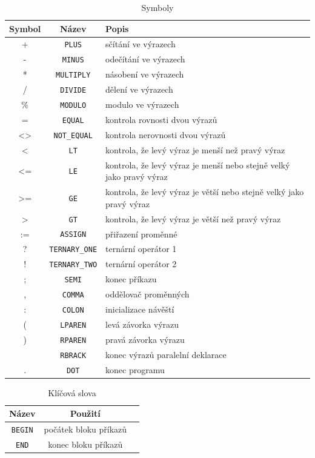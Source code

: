\documentclass[
12pt,
a4paper,
pdftex,
czech,
titlepage
]{report}
\begin{document}
\begin{longtable}{|c|c|p{10cm}|}
\caption{Symboly}
\label{symboly}
\endfirsthead
\endhead
\hline
		\textbf{Symbol} & \textbf{Název} & \textbf{Popis} \\
\hline
+ & \texttt{PLUS} & sčítání ve výrazech \\ \hline
- & \texttt{MINUS} & odečítání ve výrazech \\ \hline
* & \texttt{MULTIPLY} & násobení ve výrazech \\ \hline
/ & \texttt{DIVIDE} & dělení ve výrazech \\ \hline
\% & \texttt{MODULO} & modulo ve výrazech \\ \hline
= & \texttt{EQUAL} &  kontrola rovnosti dvou výrazů \\ \hline
<> & \texttt{NOT\_EQUAL} & kontrola nerovnosti dvou výrazů \\ \hline
< & \texttt{LT} & kontrola, že levý výraz je menší než pravý výraz \\ \hline
<= & \texttt{LE} & kontrola, že levý výraz je menší nebo stejně velký jako pravý výraz \\ \hline
>= & \texttt{GE} & kontrola, že levý výraz je větší nebo stejně velký jako pravý výraz \\ \hline
> & \texttt{GT} & kontrola, že levý výraz je větší než pravý výraz \\ \hline
:= & \texttt{ASSIGN} & přiřazení proměnné \\ \hline
? & \texttt{TERNARY\_ONE} & ternární operátor 1 \\ \hline
! & \texttt{TERNARY\_TWO} & ternární operátor 2 \\ \hline
; & \texttt{SEMI} & konec příkazu \\ \hline
, & \texttt{COMMA} & oddělovač proměnných \\ \hline
: & \texttt{COLON} & inicializace návěští \\ \hline
( & \texttt{LPAREN} & levá závorka výrazu \\ \hline
) & \texttt{RPAREN} & pravá závorka výrazu \\ \hline
[ & \texttt{LBRACK} & počátek výrazů paralelní deklarace \\ \hline
] & \texttt{RBRACK} & konec výrazů paralelní deklarace \\ \hline
. & \texttt{DOT} & konec programu \\ \hline
\end{longtable}


\begin{longtable}{|c|c|p{10cm}|}
\caption{Klíčová slova}
\label{slova}
\endfirsthead
\endhead

\hline
		\textbf{Název} &\textbf{Použití} \\
\hline
\texttt{BEGIN} & počátek bloku příkazů \\ \hline
\texttt{END} & konec bloku příkazů \\ \hline
\end{longtable}
\end{document}
